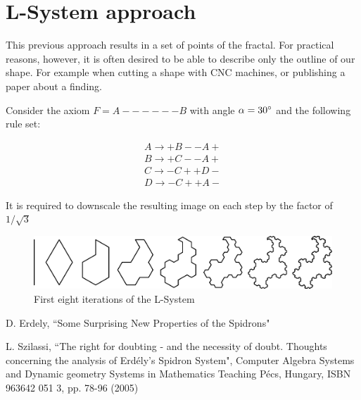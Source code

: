 \documentclass[11pt]{article}
\begin{document}
\section*{L-System approach}

\noindent This previous approach results in a set of points of the fractal. For practical reasons, however, it is often desired to be able to describe only the outline of our shape. For example when cutting a shape with CNC machines, or publishing a paper about a finding.


Consider the axiom $F=A------B$ with angle $\alpha = 30 \degree$ and the following rule set:

$$
\begin{gathered}
A\rightarrow +B--A+\\
B\rightarrow +C--A+\\
C\rightarrow -C++D-\\
D\rightarrow -C++A-
\end{gathered}
$$

\noindent It is required to downscale the resulting image on each step by the factor of $1/\sqrt3$

\begin{figure}[h!tbp]
	\begin{center}
	\includegraphics[width=6in]{figures/l-system-9-steps}
	\end{center}
	\caption{First eight iterations of the L-System}
	\label{FigSample}
\end{figure}


{
\setlength{\baselineskip}{13pt}
\begin{thebibliography}{99}

D. Erdely, ``Some Surprising New Properties of the Spidrons" 

L. Szilassi, ``The right for doubting - and the necessity of doubt. Thoughts concerning the analysis of Erd\'ely’s Spidron System", Computer Algebra Systems and Dynamic geometry Systems in Mathematics Teaching P\'ecs, Hungary, ISBN 963642 051 3, pp. 78-96 (2005)


\end{thebibliography}
}
\end{document}

